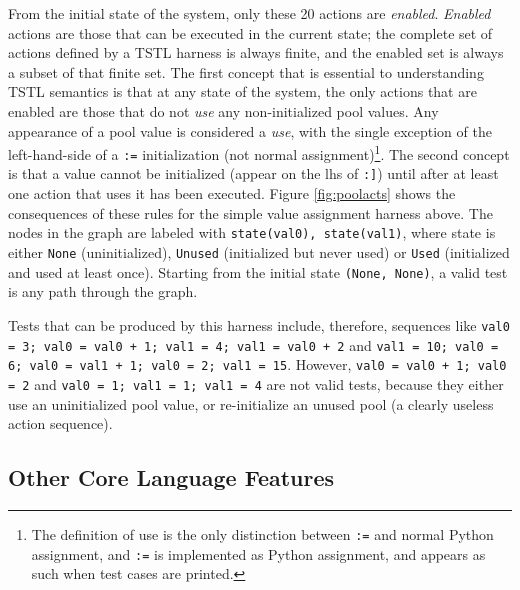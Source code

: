 From the initial state of the system, only these 20 actions are
\emph{enabled}.  \emph{Enabled} actions are those that can be executed in the
current state; the complete set of actions defined by a TSTL harness is always
finite, and the enabled set is always a subset of that finite set.  The first concept that is essential to understanding
TSTL semantics is that at any state of the
system, the only actions that are enabled are those that do not
\emph{use} any non-initialized pool values.  Any appearance of a pool
value is considered a \emph{use}, with the single exception of the left-hand-side of a
{\tt :=} initialization (not normal assignment)\footnote{The definition of
use is the only distinction between {\tt :=} and normal Python
assignment, and {\tt :=} is implemented as Python assignment, and appears
as such when test cases are printed.}.  The second concept is that a value
cannot be initialized (appear on the lhs of {\tt :]}) until after at
least one action
that uses it has been executed.  Figure \ref{fig:poolacts} shows the
consequences of these rules for the simple value assignment harness
above.  The nodes in the graph are labeled with {\tt state(val0),
  state(val1)}, where state is
either {\tt None} (uninitialized), {\tt Unused} (initialized
but never used) or {\tt Used} (initialized and used at least once).
Starting from the initial state {\tt (None, None)}, a valid test is any path
through the graph. 

Tests that can be produced by this harness include, therefore,
sequences like  {\tt val0 = 3; val0 = val0 + 1; val1 = 4; val1 = val0
  + 2} and {\tt val1 = 10; val0 = 6; val0 = val1 + 1; val0 = 2; val1 =
  15}.  However, {\tt val0 = val0 + 1; val0 = 2} and
{\tt val0 = 1; val1 = 1; val1 = 4} are not valid tests, because they
either use an uninitialized pool value, or re-initialize an unused
pool (a clearly useless action sequence).

\subsection{Other Core Language Features}

